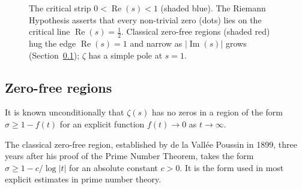 \documentclass[11pt]{amsart}
\theoremstyle{definition}
\theoremstyle{remark}
\begin{document}
\begin{figure}[ht]
\centering
{}
\caption{The critical strip $0<\operatorname{Re}(s)<1$ (shaded blue). The Riemann Hypothesis asserts that every non-trivial zero (dots) lies on the critical line $\operatorname{Re}(s)=\tfrac12$. Classical zero-free regions (shaded red) hug the edge $\operatorname{Re}(s)=1$ and narrow as $|\operatorname{Im}(s)|$ grows (Section~\ref{sec:zfr}); $\zeta$ has a simple pole at $s=1$.}
\label{fig:strip}
\end{figure}

\subsection{Zero-free regions}\label{sec:zfr}

It is known unconditionally that $\zeta(s)$ has no zeros in a region of the form $\sigma \ge 1 - f(t)$ for an explicit function $f(t) \to 0$ as $t \to \infty$.

The classical zero-free region, established by de la Vall\'ee Poussin \cite{delavallee1899} in 1899, three years after his proof of the Prime Number Theorem, takes the form $\sigma \ge 1 - c/\log|t|$ for an absolute constant $c > 0$. It is the form used in most explicit estimates in prime number theory.
\end{document}
